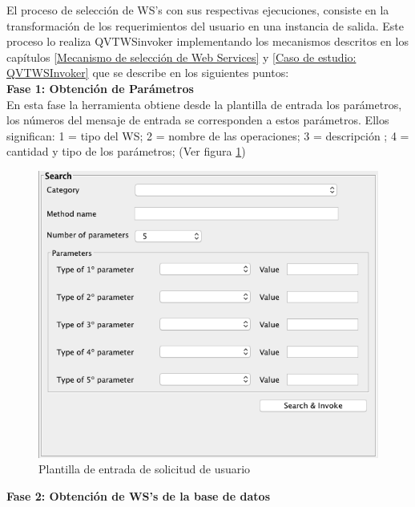 El proceso de selección de WS's con sus respectivas ejecuciones, consiste en la transformación de los requerimientos del usuario en una instancia de salida. Este proceso lo realiza QVTWSinvoker implementando los mecanismos descritos en los capítulos \ref{Mecanismo de selección de Web Services} y \ref{Caso de estudio: QVTWSInvoker} que se describe en los siguientes puntos:\\

\textbf{Fase 1: Obtención de Parámetros}\\

En esta fase la herramienta obtiene desde la plantilla de entrada los parámetros, los números del mensaje de entrada se corresponden a estos parámetros. Ellos significan: 1 = tipo del WS; 2 = nombre de las operaciones; 3 = descripción ; 4 = cantidad y tipo de los parámetros; (Ver figura \ref{fig:Plantilla de entrada de solicitud de usuario})\\

\begin{figure}[!h] 
	\begin{center}
		\includegraphics [scale=0.60]{imagenes/Plantilla_de_entrada_de_solicitud_de_usuario.png}
	\end{center}
	\caption{Plantilla de entrada de solicitud de usuario}
	\label{fig:Plantilla de entrada de solicitud de usuario}
\end{figure} 

\textbf{Fase 2: Obtención de WS's de la base de datos}\\

